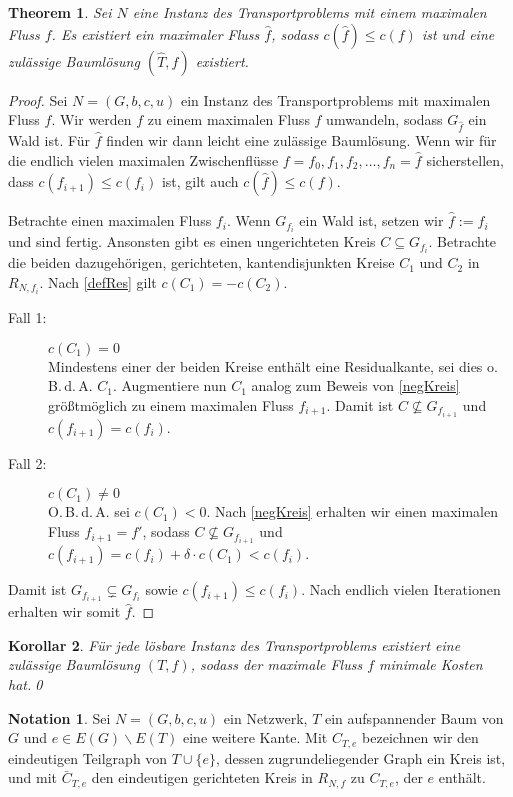 \documentclass[a4paper,twoside,ngerman]{report}
\theoremstyle{plain}
\newtheorem{thm}{Theorem}
\newtheorem{kor}[thm]{Korollar}
\theoremstyle{definition}
\newtheorem*{nota}{Notation}
\newcommand{\obda}{o.\,B.\,d.\,A. }
\newcommand{\Obda}{O.\,B.\,d.\,A. }
\begin{document}
\begin{thm}\label{BLex}Sei $N$ eine Instanz des Transportproblems mit einem maximalen Fluss $f$. Es existiert ein maximaler Fluss $\hat{f}$, sodass $c(\hat{f})\leq c(f)$ ist und eine zulässige Baumlösung $(\hat{T},\hat{f})$ existiert.\end{thm}
\begin{proof}Sei $N=(G,b,c,u)$ ein Instanz des Transportproblems mit maximalen Fluss $f$. Wir werden $f$ zu einem maximalen Fluss $\hat{f}$ umwandeln, sodass $G_{\hat{f}}$ ein Wald ist. Für $\hat{f}$ finden wir dann leicht eine zulässige Baumlösung. Wenn wir für die endlich vielen maximalen Zwischenflüsse $f=f_0,f_1,f_2,\ldots,f_n=\hat{f}$ sicherstellen, dass $c(f_{i+1})\leq c(f_i)$ ist, gilt auch $c(\hat{f})\leq c(f)$.

Betrachte einen maximalen Fluss $f_i$. Wenn $G_{f_i}$ ein Wald ist, setzen wir $\hat{f}:=f_i$ und sind fertig. Ansonsten gibt es einen ungerichteten Kreis $C\subseteq G_{f_i}$. Betrachte die beiden dazugehörigen, gerichteten, kantendisjunkten Kreise $C_1$ und $C_2$ in $R_{N,f_i}$. Nach \cref{defRes} gilt $c(C_1)=-c(C_2)$.
\begin{description}
\item[Fall 1:] $c(C_1)=0$\\
	Mindestens einer der beiden Kreise enthält eine Residualkante, sei dies \obda $C_1$. Augmentiere nun $C_1$ analog zum Beweis von \cref{negKreis} größtmöglich zu einem maximalen Fluss $f_{i+1}$. Damit ist $C\nsubseteq G_{f_{i+1}}$ und $c(f_{i+1}) = c(f_i)$.
\item[Fall 2:] $c(C_1)\neq0$\\
	\Obda sei $c(C_1)<0$. Nach \cref{negKreis} erhalten wir einen maximalen Fluss $f_{i+1}=f'$, sodass $C\nsubseteq G_{f_{i+1}}$ und $c(f_{i+1}) = c(f_i) + \delta\cdot c(C_1)<c(f_i)$.
\end{description}

Damit ist $G_{f_{i+1}}\subsetneq G_{f_i}$ sowie $c(f_{i+1})\leq c(f_i)$. Nach endlich vielen Iterationen erhalten wir somit $\hat{f}$.
\end{proof}

\begin{kor}\label{TP}Für jede lösbare Instanz des Transportproblems existiert eine zulässige Baumlösung $(T,f)$, sodass der maximale Fluss $f$ minimale Kosten hat.\qed\end{kor}

\begin{nota}Sei $N=(G,b,c,u)$ ein Netzwerk, $T$ ein aufspannender Baum von $G$ und $e\in E(G)\backslash E(T)$ eine weitere Kante. Mit $C_{T,e}$ bezeichnen wir den eindeutigen Teilgraph von $T\cup\{e\}$, dessen zugrundeliegender Graph ein Kreis ist, und mit  $\bar{C}_{T,e}$ den eindeutigen gerichteten Kreis in $R_{N,f}$ zu $C_{T,e}$, der $e$ enthält.\end{nota}
\end{document}
